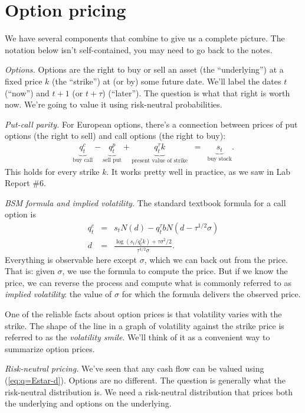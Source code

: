 \documentclass[11pt]{article}
\begin{document}
\section{Option pricing}

We have several components that combine to give us a complete picture.
The notation below isn't self-contained, you may need to go back to the notes.


{\it Options.\/}
Options are the right to buy or sell an asset
(the ``underlying'')
at a fixed price $k$ (the ``strike'')
at (or by) some future date.
We'll label the dates $t$ (``now'') and $t+1$ (or $t+\tau$) (``later'').
The question is what that right is worth now.
We're going to value it using risk-neutral probabilities.

{\it Put-call parity.\/}
For European options, there's a connection between prices of put options
(the right to sell) and call options (the right to buy):
\begin{eqnarray*}
    \underbrace{q^c_t}_{\mbox{buy call}} -
    \underbrace{q^p_t}_{\mbox{sell put}} +
    \underbrace{q^\tau_t k}_{\mbox{present value of strike}}
    &=&
    \underbrace{s_t}_{\mbox{buy stock}} .
    \label{eq:put-call-parity}
\end{eqnarray*}
This holds for every strike $k$.
It works pretty well in practice, as we saw in Lab Report \#6.

{\it BSM formula and implied volatility.\/}
The standard textbook formula for a call option is
\begin{eqnarray*}
        q^c_t &=& s_t N(d) - q^\tau_t b N (d - \tau^{1/2}\sigma ) \\
          d &=& \frac{\log(s_t/q^\tau_t k) + \tau \sigma^2/2}{\tau^{1/2}\sigma} .
\end{eqnarray*}
Everything is observable here except $\sigma$, which
we can back out from the price.
That is: given $\sigma$, we use the formula to compute the price.
But if we know the price, we can reverse the process and compute what is
commonly referred to as
{\it implied volatility\/}:  the value of $\sigma$ for which the formula
delivers the observed price.

One of the reliable facts about option prices is that volatility varies with the strike.
The shape of the line in a  graph of volatility against the strike price
is referred to as the {\it volatility smile\/}.
We'll think of it as a convenient way to summarize option prices.

{\it Risk-neutral pricing.\/}
We've seen that any cash flow can be valued using (\ref{eq:q=Estar-d}).
Options are no different.
The question is generally what the risk-neutral distribution is.
We need a risk-neutral distribution that prices both the underlying
and options on the underlying.
\end{document}
